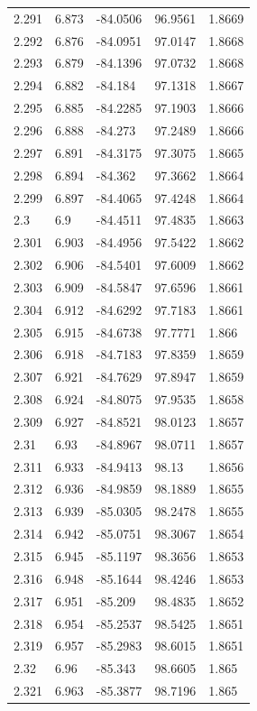 \begin{tabular}{lllll}
2.291 & 6.873 & -84.0506 & 96.9561 & 1.8669 \\
2.292 & 6.876 & -84.0951 & 97.0147 & 1.8668 \\
2.293 & 6.879 & -84.1396 & 97.0732 & 1.8668 \\
2.294 & 6.882 & -84.184 & 97.1318 & 1.8667 \\
2.295 & 6.885 & -84.2285 & 97.1903 & 1.8666 \\
2.296 & 6.888 & -84.273 & 97.2489 & 1.8666 \\
2.297 & 6.891 & -84.3175 & 97.3075 & 1.8665 \\
2.298 & 6.894 & -84.362 & 97.3662 & 1.8664 \\
2.299 & 6.897 & -84.4065 & 97.4248 & 1.8664 \\
2.3 & 6.9 & -84.4511 & 97.4835 & 1.8663 \\
2.301 & 6.903 & -84.4956 & 97.5422 & 1.8662 \\
2.302 & 6.906 & -84.5401 & 97.6009 & 1.8662 \\
2.303 & 6.909 & -84.5847 & 97.6596 & 1.8661 \\
2.304 & 6.912 & -84.6292 & 97.7183 & 1.8661 \\
2.305 & 6.915 & -84.6738 & 97.7771 & 1.866 \\
2.306 & 6.918 & -84.7183 & 97.8359 & 1.8659 \\
2.307 & 6.921 & -84.7629 & 97.8947 & 1.8659 \\
2.308 & 6.924 & -84.8075 & 97.9535 & 1.8658 \\
2.309 & 6.927 & -84.8521 & 98.0123 & 1.8657 \\
2.31 & 6.93 & -84.8967 & 98.0711 & 1.8657 \\
2.311 & 6.933 & -84.9413 & 98.13 & 1.8656 \\
2.312 & 6.936 & -84.9859 & 98.1889 & 1.8655 \\
2.313 & 6.939 & -85.0305 & 98.2478 & 1.8655 \\
2.314 & 6.942 & -85.0751 & 98.3067 & 1.8654 \\
2.315 & 6.945 & -85.1197 & 98.3656 & 1.8653 \\
2.316 & 6.948 & -85.1644 & 98.4246 & 1.8653 \\
2.317 & 6.951 & -85.209 & 98.4835 & 1.8652 \\
2.318 & 6.954 & -85.2537 & 98.5425 & 1.8651 \\
2.319 & 6.957 & -85.2983 & 98.6015 & 1.8651 \\
2.32 & 6.96 & -85.343 & 98.6605 & 1.865 \\
2.321 & 6.963 & -85.3877 & 98.7196 & 1.865 \\

\end{tabular}
